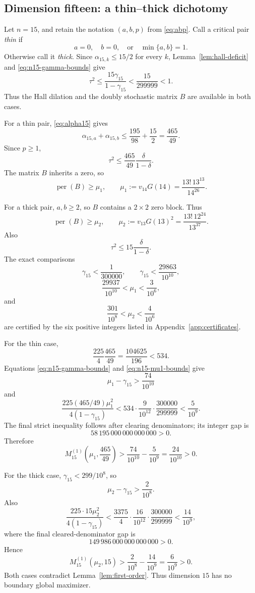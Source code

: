 \documentclass[11pt]{article}
\theoremstyle{definition}
\newcommand{\per}{\operatorname{per}}
\newcommand{\1}{\mathbf{1}}
\begin{document}
\subsection{Dimension fifteen: a thin--thick dichotomy}

Let $n=15$, and retain the notation $(a,b,p)$ from \eqref{eq:abp}.  Call a critical pair \emph{thin} if
\[
 a=0,
 \quad b=0,
 \quad\text{or}\quad
 \min\{a,b\}=1.
\]
Otherwise call it \emph{thick}.  Since $\alpha_{15,k}\le15/2$ for every $k$, Lemma~\ref{lem:hall-deficit} and \eqref{eq:n15-gamma-bounds} give
\[
 \tau^2\le\frac{15\gamma_{15}}{1-\gamma_{15}}
 <\frac{15}{299999}<1.
\]
Thus the Hall dilation and the doubly stochastic matrix $B$ are available in both cases.

For a thin pair, \eqref{eq:alpha15} gives
\[
 \alpha_{15,a}+\alpha_{15,b}
 \le\frac{195}{98}+\frac{15}{2}
 =\frac{465}{49}.
\]
Since $p\ge1$,
\[
 \tau^2\le\frac{465}{49}\frac{\delta}{1-\delta}.
 \tag{6.15}\label{eq:n15-thin-tau}
\]
The matrix $B$ inherits a zero, so
\[
 \per(B)\ge\mu_1,
 \qquad
 \mu_1:=v_{14}G(14)
 =\frac{13!\,13^{13}}{14^{26}}.
 \tag{6.16}\label{eq:mu1}
\]

For a thick pair, $a,b\ge2$, so $B$ contains a $2\times2$ zero block.  Thus
\[
 \per(B)\ge\mu_2,
 \qquad
 \mu_2:=v_{13}G(13)^2
 =\frac{13!\,12^{24}}{13^{37}}.
 \tag{6.17}\label{eq:mu2}
\]
Also
\[
 \tau^2\le15\frac{\delta}{1-\delta}.
 \tag{6.18}\label{eq:n15-thick-tau}
\]
The exact comparisons
\[
 \gamma_{15}<\frac1{300000},
 \qquad
 \gamma_{15}<\frac{29863}{10^{10}},
 \tag{6.19}\label{eq:n15-gamma-bounds}
\]
\[
 \frac{29937}{10^{10}}<\mu_1<\frac3{10^6},
 \tag{6.20}\label{eq:n15-mu1-bounds}
\]
and
\[
 \frac{301}{10^8}<\mu_2<\frac4{10^6}
 \tag{6.21}\label{eq:n15-mu2-bounds}
\]
are certified by the six positive integers listed in Appendix~\ref{app:certificates}.

For the thin case,
\[
 \frac{225}{4}\frac{465}{49}
 =\frac{104625}{196}<534.
\]
Equations \eqref{eq:n15-gamma-bounds} and \eqref{eq:n15-mu1-bounds} give
\[
 \mu_1-\gamma_{15}>\frac{74}{10^{10}}
\]
and
\[
 \frac{225(465/49)\mu_1^2}{4(1-\gamma_{15})}
 <534\cdot\frac9{10^{12}}\cdot\frac{300000}{299999}
 <\frac5{10^9}.
\]
The final strict inequality follows after clearing denominators; its integer gap is
\[
 58\,195\,000\,000\,000\,000>0.
\]
Therefore
\[
 M_{15}^{(1)}\left(\mu_1,\frac{465}{49}\right)
 >\frac{74}{10^{10}}-\frac5{10^9}
 =\frac{24}{10^{10}}>0.
 \tag{6.22}\label{eq:n15-thin-margin}
\]

For the thick case, $\gamma_{15}<299/10^8$, so
\[
 \mu_2-\gamma_{15}>\frac2{10^8}.
\]
Also
\[
 \frac{225\cdot15\mu_2^2}{4(1-\gamma_{15})}
 <\frac{3375}{4}\cdot\frac{16}{10^{12}}
 \cdot\frac{300000}{299999}
 <\frac{14}{10^9},
\]
where the final cleared-denominator gap is
\[
 149\,986\,000\,000\,000\,000>0.
\]
Hence
\[
 M_{15}^{(1)}(\mu_2,15)
 >\frac2{10^8}-\frac{14}{10^9}
 =\frac6{10^9}>0.
 \tag{6.23}\label{eq:n15-thick-margin}
\]
Both cases contradict Lemma~\ref{lem:first-order}.  Thus dimension $15$ has no boundary global maximizer.
\end{document}
